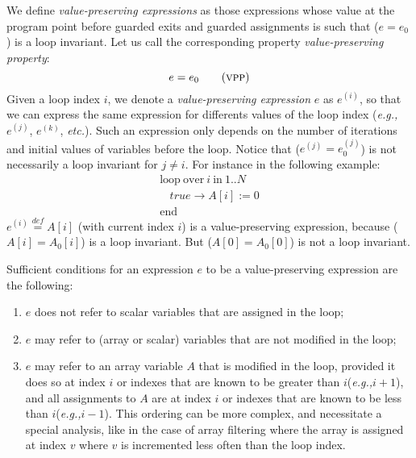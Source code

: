 \documentclass[a4paper,10pt]{article}
\newcommand{\eg}{\textit{e.g.,}\xspace}
\newcommand{\etc}{\textit{etc.}\xspace}
\newcommand{\idx}{\ensuremath{i}\xspace}
\newcommand{\at}[1]{{(#1)}}
\newcommand{\KWloop}{\ensuremath{\mathrm{loop}~}}
\newcommand{\KWend}{\ensuremath{\mathrm{end}~}}
\newcommand{\KWover}{\ensuremath{\mathrm{over}~}}
\newcommand{\KWin}{\ensuremath{~\mathrm{in}~}}
\newcommand{\symdef}{\ensuremath{\overset{\mathit{def}}{=}}}
\newcommand{\vpp}{\textsc{vpp}\xspace}
\begin{document}
We define \textit{value-preserving expressions} as those expressions whose
value at the program point before guarded exits and guarded assignments is
such that ($e=e_0$) is a loop invariant. Let us call the corresponding property
\textit{value-preserving property}:
\begin{equation}
 e=e_0 \tag{\vpp}
\end{equation}
Given a loop index \idx, we denote a \textit{value-preserving expression} $e$
as $e^\at{\idx}$, so that we can express the same expression for differents
values of the loop index (\eg $e^\at{j}$, $e^\at{k}$, \etc). Such an expression
only depends on the number of iterations and initial values of variables
before the loop. Notice that ($e^\at{j} = e_0^\at{j}$) is not necessarily a
loop invariant for $j \neq i$.  For instance in the following example:
$$\begin{array}{l}
  \KWloop \KWover i \KWin 1 .. N \\
  ~~~~ \mathit{true} \rightarrow A[i] := 0\\
  \KWend
\end{array}$$
$e^\at{\idx} \symdef A[\idx]$ (with current index \idx) is a 
value-preserving expression, because ($A[\idx]=A_0[\idx]$) is a loop 
invariant. But ($A[0]=A_0[0]$) is not a loop invariant.

Sufficient conditions for an expression $e$ to be a value-preserving expression
are the following:
\begin{enumerate}
\item $e$ does not refer to scalar variables that are assigned in the loop;
\item $e$ may refer to (array or scalar) variables that are not modified in the loop;
\item $e$ may refer to an array variable $A$ that is modified in the loop,
  provided it does so at index \idx or indexes that are known to be greater
  than \idx (\eg $\idx + 1$), and all assignments to $A$ are at index \idx or
  indexes that are known to be less than \idx (\eg $\idx - 1$). This ordering
  can be more complex, and necessitate a special analysis, like in the case of
  array filtering where the array is assigned at index $v$ where $v$ is
  incremented less often than the loop index.
\end{enumerate}

\end{document}
